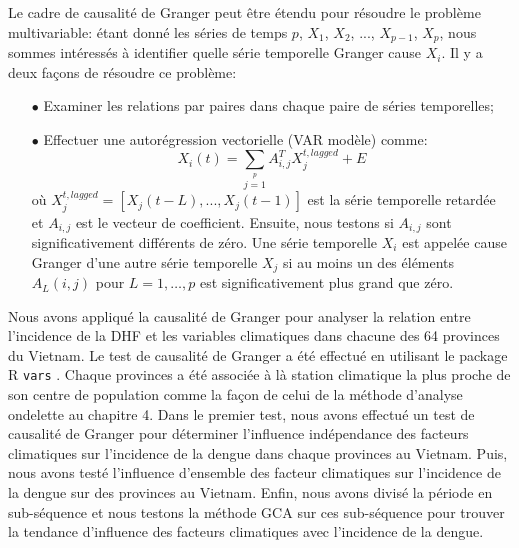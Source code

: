 Le cadre de causalité de Granger peut être étendu pour résoudre le problème multivariable: étant donné les séries de temps $ p $, $ X_1 $, $ X_2 $, ..., $ X_ {p-1} $, $ X_p $, nous sommes intéressés à identifier quelle série temporelle Granger cause $X_i$. Il y a deux façons de résoudre ce problème:
\begin{itemize} 
\item[$\bullet$] Examiner les relations par paires dans chaque paire de séries temporelles;
\item[$\bullet$] Effectuer une autorégression vectorielle (VAR modèle) comme:
 \begin{equation}
 X_i(t) = \sum\limits_{j = 1}\limits^pA_{i, j}^TX_j^{t, lagged} + E
\end{equation}
 où $X_j^{t, lagged} = [X_j (t - L), ..., X_j (t - 1)] $ est la série temporelle retardée et $A_ {i, j}$ est le vecteur de coefficient. Ensuite, nous testons si $A_ {i, j}$ sont significativement différents de zéro. Une série temporelle $ {\displaystyle X_{i}} $ est appelée cause Granger d'une autre série temporelle $ {\displaystyle X_{j}} $ si au moins un des éléments $ {\displaystyle A_{L} (i, j)} $ pour $ {L = 1, \ldots, p} $ est significativement plus grand que zéro.
\end{itemize} 

Nous avons appliqué la causalité de Granger pour analyser la relation entre l'incidence de la DHF et les variables climatiques dans chacune des 64 provinces du Vietnam. Le test de causalité de Granger a été effectué en utilisant le package R \texttt{vars}  \cite{pfaff2013package}. Chaque provinces a été associée à là station climatique la plus proche de son centre de population comme la façon de celui de la méthode d'analyse ondelette au chapitre 4. Dans le premier test, nous avons effectué un test de causalité de Granger pour déterminer l'influence indépendance des facteurs climatiques sur l'incidence de la dengue dans chaque provinces au Vietnam. Puis, nous avons testé l'influence d'ensemble des facteur climatiques sur l'incidence de la dengue sur des provinces au Vietnam. Enfin, nous avons divisé la période en sub-séquence et nous testons la méthode GCA sur ces sub-séquence pour trouver la tendance d'influence des facteurs climatiques avec l'incidence de la dengue. 

\section{\Rs}

